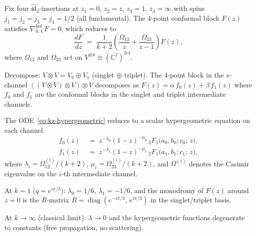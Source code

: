 \begin{computation}
Fix four $\widehat{\mathfrak{sl}}_2$-insertions at
$z_1=0$, $z_2=z$, $z_3=1$, $z_4=\infty$ with spins
$j_1=j_2=j_3=j_4=1/2$ (all fundamental).
The $4$-point conformal block $F(z)$ satisfies
$\nabla^{\mathrm{hol}}_{0,4}\,F=0$, which reduces to
\begin{equation}%
\frac{dF}{dz}
\;=\;
\frac{1}{k+2}
\left(
\frac{\Omega_{12}}{z}
+\frac{\Omega_{23}}{z-1}
\right)F(z),
\end{equation}
where $\Omega_{12}$ and $\Omega_{23}$ act on
$V^{\otimes 4}\cong(\mathbb C^2)^{\otimes 4}$.

Decompose: $V\otimes V=V_0\oplus V_1$ (singlet $\oplus$
triplet). The $4$-point block in the $s$-channel
$((V\otimes V)\otimes V)\otimes V$ decomposes as
$F(z)=\alpha\,f_0(z)+\beta\,f_1(z)$
where $f_0$ and $f_1$ are the conformal blocks in the
singlet and triplet intermediate channels.

The ODE~\eqref{eq:kz-hypergeometric} reduces to
a scalar hypergeometric equation on each channel:
\begin{align*}
f_0(z)
&\;=\;
z^{-\lambda_0}(1-z)^{-\mu_0}\,
{}_2F_1\!\bigl(a_0,b_0;c_0;\,z\bigr),\\
f_1(z)
&\;=\;
z^{-\lambda_1}(1-z)^{-\mu_1}\,
{}_2F_1\!\bigl(a_1,b_1;c_1;\,z\bigr),
\end{align*}
where $\lambda_i=\Omega^{(i)}_{12}/(k{+}2)$,
$\mu_i=\Omega^{(i)}_{23}/(k{+}2)$, and
$\Omega^{(i)}$ denotes the Casimir eigenvalue
on the $i$-th intermediate channel.

At $k=1$ ($q=e^{i\pi/3}$): $\lambda_0=1/6$,
$\lambda_1=-1/6$, and the monodromy of $F(z)$ around
$z=0$ is the $R$-matrix
$R=\operatorname{diag}(e^{-i\pi/3},\,e^{i\pi/3})$
in the singlet/triplet basis.

At $k\to\infty$ (classical limit): $\lambda\to 0$ and
the hypergeometric functions degenerate to constants
(free propagation, no scattering).
\end{computation}

